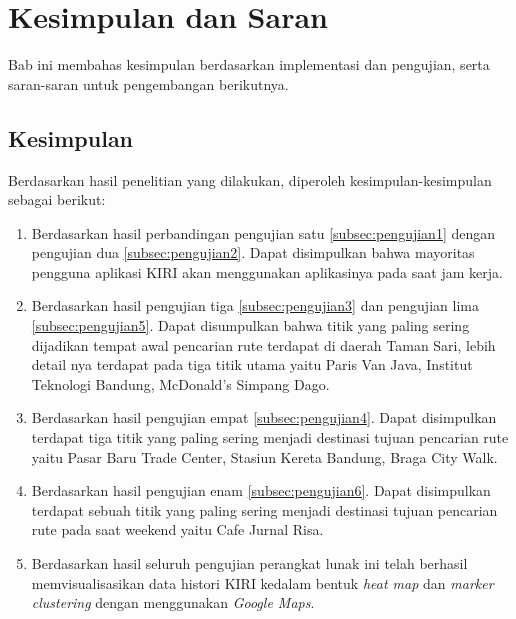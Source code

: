 \chapter{Kesimpulan dan Saran}
\label{chap:kesimpulan_dan_saran}
Bab ini membahas kesimpulan berdasarkan implementasi dan pengujian, serta saran-saran untuk pengembangan berikutnya.

\section{Kesimpulan}
Berdasarkan hasil penelitian yang dilakukan, diperoleh kesimpulan-kesimpulan sebagai berikut:
\begin{enumerate}
	\item Berdasarkan hasil perbandingan pengujian satu \ref{subsec:pengujian1} dengan pengujian dua \ref{subsec:pengujian2}. Dapat disimpulkan bahwa mayoritas pengguna aplikasi KIRI akan menggunakan aplikasinya pada saat jam kerja.
	
	\item Berdasarkan hasil pengujian tiga \ref{subsec:pengujian3} dan pengujian lima \ref{subsec:pengujian5}. Dapat disumpulkan bahwa titik yang paling sering dijadikan tempat awal pencarian rute terdapat di daerah Taman Sari, lebih detail nya terdapat pada tiga titik utama yaitu Paris Van Java, Institut Teknologi Bandung, McDonald's Simpang Dago.
	
	\item Berdasarkan hasil pengujian empat \ref{subsec:pengujian4}. Dapat disimpulkan terdapat tiga titik yang paling sering menjadi destinasi tujuan pencarian rute yaitu Pasar Baru Trade Center, Stasiun Kereta Bandung, Braga City Walk.
	
	\item Berdasarkan hasil pengujian enam \ref{subsec:pengujian6}. Dapat disimpulkan terdapat sebuah  titik yang paling sering menjadi destinasi tujuan pencarian rute pada saat weekend  yaitu Cafe Jurnal Risa.
	
	\item Berdasarkan hasil seluruh pengujian perangkat lunak ini telah berhasil memvisualisasikan data histori KIRI kedalam bentuk \textit{heat map} dan \textit{marker clustering} dengan menggunakan \textit{Google Maps}.
	
\end{enumerate}

